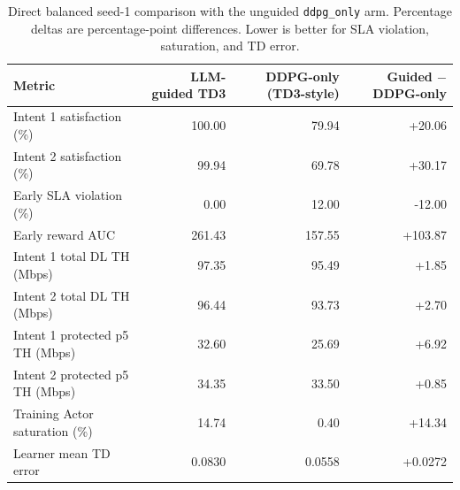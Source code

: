 \begin{table}[t]
\centering
\caption{Direct balanced seed-1 comparison with the unguided \texttt{ddpg\_only} arm. Percentage deltas are percentage-point differences. Lower is better for SLA violation, saturation, and TD error.}
\label{tab:guided-vs-ddpg}
\begin{tabular}{lrrr}
\toprule
Metric & LLM-guided TD3 & DDPG-only (TD3-style) & Guided $-$ DDPG-only\\
\midrule
Intent 1 satisfaction (\%) & 100.00 & 79.94 & +20.06 \\
Intent 2 satisfaction (\%) & 99.94 & 69.78 & +30.17 \\
Early SLA violation (\%) & 0.00 & 12.00 & -12.00 \\
Early reward AUC & 261.43 & 157.55 & +103.87 \\
Intent 1 total DL TH (Mbps) & 97.35 & 95.49 & +1.85 \\
Intent 2 total DL TH (Mbps) & 96.44 & 93.73 & +2.70 \\
Intent 1 protected p5 TH (Mbps) & 32.60 & 25.69 & +6.92 \\
Intent 2 protected p5 TH (Mbps) & 34.35 & 33.50 & +0.85 \\
Training Actor saturation (\%) & 14.74 & 0.40 & +14.34 \\
Learner mean TD error & 0.0830 & 0.0558 & +0.0272 \\
\bottomrule
\end{tabular}
\end{table}
